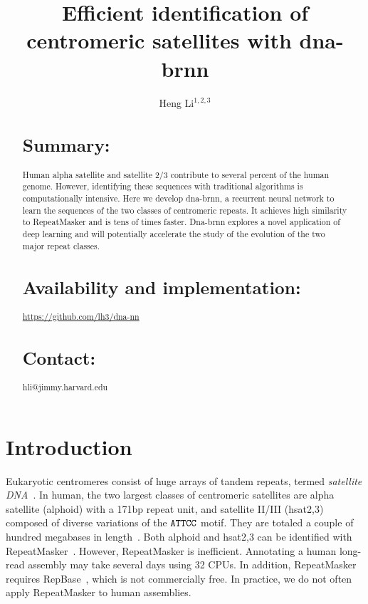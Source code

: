 \documentclass{bioinfo}
\begin{document}

\title{Efficient identification of centromeric satellites with dna-brnn}
\author[Li]{Heng Li$^{1,2,3}$}
\address{$^1$ Department of data sciences, Dana-Farber Cancer Institute, 450 Brookline Ave, Boston, MA 02115, USA\\
$^2$ Department of biomedical informatics, Harvard Medical School, 25 Shattuck Street, Boston, MA 02115, USA\\
$^3$ Broad Institute, 415 Main St, Cambridge, MA 02142, USA}

\maketitle

\begin{abstract}

\section{Summary:} Human alpha satellite and satellite 2/3 contribute to
several percent of the human genome. However, identifying these sequences with
traditional algorithms is computationally intensive. Here we develop dna-brnn,
a recurrent neural network to learn the sequences of the two classes of
centromeric repeats. It achieves high similarity to RepeatMasker and is tens of
times faster. Dna-brnn explores a novel application of deep learning and will
potentially accelerate the study of the evolution of the two major repeat classes.

\section{Availability and implementation:}
\href{https://github.com/lh3/dna-nn}{https://github.com/lh3/dna-nn}

\section{Contact:} hli@jimmy.harvard.edu
\end{abstract}

\section{Introduction}

Eukaryotic centromeres consist of huge arrays of tandem repeats, termed
\emph{satellite DNA}~\citep{Garrido-Ramos:2017aa}. In human, the two largest
classes of centromeric satellites are alpha satellite (alphoid) with a 171bp
repeat unit, and satellite II/III (hsat2,3) composed of diverse variations of
the ${\tt ATTCC}$ motif. They are totaled a couple of hundred megabases in
length~\citep{Schneider:2017aa}. Both alphoid and hsat2,3 can be identified
with RepeatMasker~\citep{Tarailo-Graovac:2009aa}. However, RepeatMasker is
inefficient. Annotating a human long-read assembly may take several days using
32 CPUs. In addition, RepeatMasker requires RepBase~\citep{Kapitonov:2008aa},
which is not commercially free. In practice, we do not often apply RepeatMasker
to human assemblies.
\end{document}
